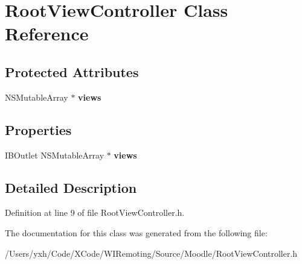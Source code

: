 \hypertarget{interface_root_view_controller}{
\section{RootViewController Class Reference}
\label{interface_root_view_controller}
}
\subsection*{Protected Attributes}
\begin{DoxyCompactItemize}
\item 
\hypertarget{interface_root_view_controller_a0b6d1432fbfbdc3f05a734da9ec48495}{
NSMutableArray $\ast$ {\bfseries views}}
\label{interface_root_view_controller_a0b6d1432fbfbdc3f05a734da9ec48495}

\end{DoxyCompactItemize}
\subsection*{Properties}
\begin{DoxyCompactItemize}
\item 
\hypertarget{interface_root_view_controller_a497ceb4b3b174df77fd09ff3ebf73245}{
IBOutlet NSMutableArray $\ast$ {\bfseries views}}
\label{interface_root_view_controller_a497ceb4b3b174df77fd09ff3ebf73245}

\end{DoxyCompactItemize}


\subsection{Detailed Description}


Definition at line 9 of file RootViewController.h.

The documentation for this class was generated from the following file:\begin{DoxyCompactItemize}
\item 
/Users/yxh/Code/XCode/WIRemoting/Source/Moodle/RootViewController.h\end{DoxyCompactItemize}
